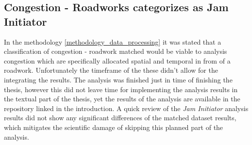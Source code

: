 \subsection{Congestion - Roadworks categorizes as Jam Initiator}
\label{analysis_processing_correlation_arbis_initiator}
In the methodology \cref{methodology_data_processing} it was stated that a classification of congestion - roadwork matched would be viable to analysis congestion which are specifically allocated spatial and temporal in from of a roadwork. Unfortunately the timeframe of the these didn't allow for the integrating the results. The analysis was finished just in time of finishing the thesis, however this did not leave time for implementing the analysis results in the textual part of the thesis, yet the results of the analysis are available in the repository linked in the introduction. A quick review of the \textit{Jam Initiator} analysis results did not show any significant differences of the matched dataset results, which mitigates the scientific damage of skipping this planned part of the analysis.